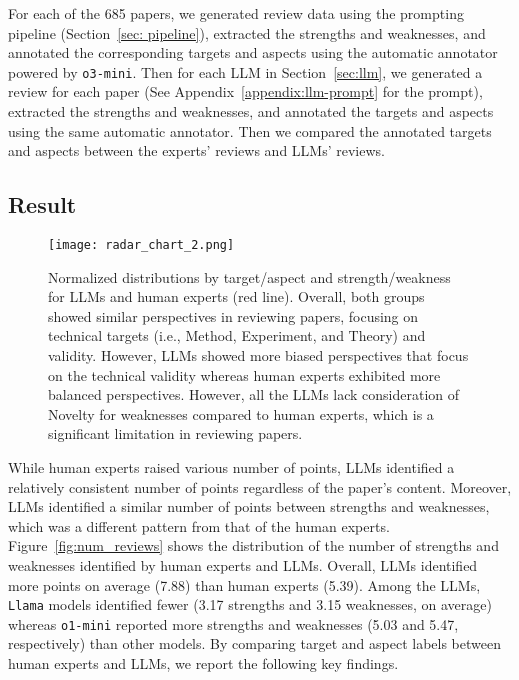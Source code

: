 For each of the 685 papers, we generated review data using the prompting pipeline (Section~\ref{sec: pipeline}), extracted the strengths and weaknesses, and annotated the corresponding targets and aspects using the automatic annotator powered by \texttt{o3-mini}. Then for each LLM in Section~\ref{sec:llm}, we generated a review for each paper (See Appendix~\ref{appendix:llm-prompt} for the prompt), extracted the strengths and weaknesses, and annotated the targets and aspects using the same automatic annotator. Then we compared the annotated targets and aspects between the experts' reviews and LLMs' reviews.



\subsection{Result}


\begin{figure*}[t]
    \centering
    \texttt{[image: radar\_chart\_2.png]}
    \caption{Normalized distributions by target/aspect and strength/weakness for LLMs and human experts (red line). Overall, both groups showed similar perspectives in reviewing papers, focusing on technical targets (i.e., Method, Experiment, and Theory) and validity. However, LLMs showed more biased perspectives that focus on the technical validity whereas human experts exhibited more balanced perspectives. However, all the LLMs lack consideration of Novelty for weaknesses compared to human experts, which is a significant limitation in reviewing papers.}
    \label{fig:radar_chart}
\end{figure*}




While human experts raised various number of points, LLMs identified a relatively consistent number of points regardless of the paper's content. Moreover, LLMs identified a similar number of points between strengths and weaknesses, which was a different pattern from that of the human experts. Figure~\ref{fig:num_reviews} shows the distribution of the number of strengths and weaknesses identified by human experts and LLMs. Overall, LLMs identified more points on average (7.88) than human experts (5.39). Among the LLMs, \texttt{Llama} models identified fewer (3.17 strengths and 3.15 weaknesses, on average) whereas \texttt{o1-mini} reported more strengths and weaknesses (5.03 and 5.47, respectively) than other models. By comparing target and aspect labels between human experts and LLMs, we report the following key findings.





